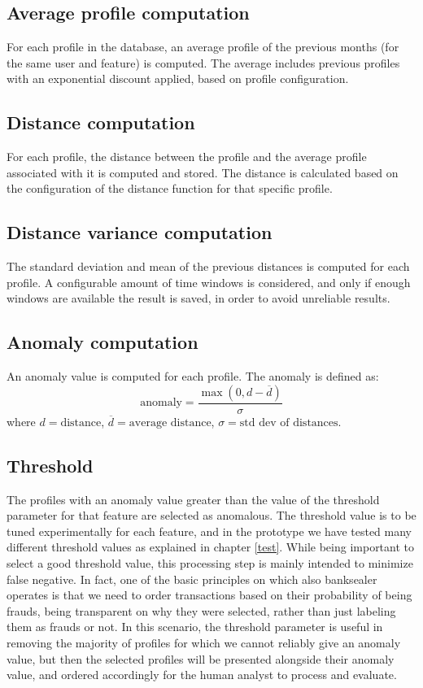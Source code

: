 \subsection{Average profile computation}
For each profile in the database, an average profile of the previous months (for the same user and feature) is computed. The average includes previous profiles with an exponential discount applied, based on profile configuration.

\subsection{Distance computation}
For each profile, the distance between the profile and the average profile associated with it is computed and stored. The distance is calculated based on the configuration of the distance function for that specific profile.

\subsection{Distance variance computation}
The standard deviation and mean of the previous distances is computed for each profile. A configurable amount of time windows is considered, and only if enough windows are available the result is saved, in order to avoid unreliable results.

\subsection{Anomaly computation}
An anomaly value is computed for each profile. The anomaly is defined as:
\begin{displaymath}
  \text{anomaly} = \frac{\max(0, d - \overline{d})}{\sigma}
\end{displaymath}
where $d = \text{distance}$, $\overline{d} = \text{average distance}$, $\sigma = \text{std dev of distances}$.

\subsection{Threshold}
The profiles with an anomaly value greater than the value of the threshold parameter for that feature are selected as anomalous. The threshold value is to be tuned experimentally for each feature, and in the prototype we have tested many different threshold values as explained in chapter \ref{test}.
While being important to select a good threshold value, this processing step is mainly intended to minimize false negative. In fact, one of the basic principles on which also banksealer operates is that we need to order transactions based on their probability of being frauds, being transparent on why they were selected, rather than just labeling them as frauds or not. In this scenario, the threshold parameter is useful in removing the majority of profiles for which we cannot reliably give an anomaly value, but then the selected profiles will be presented alongside their anomaly value, and ordered accordingly for the human analyst to process and evaluate.

